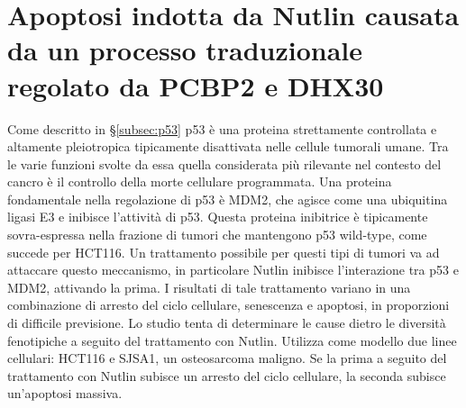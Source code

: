\section{Apoptosi indotta da Nutlin causata da un processo traduzionale regolato da PCBP2 e DHX30}
Come descritto in \S\ref{subsec:p53} p53 \`e una proteina strettamente controllata e altamente pleiotropica tipicamente disattivata nelle cellule tumorali umane.
Tra le varie funzioni svolte da essa quella considerata pi\`u rilevante nel contesto del cancro \`e il controllo della morte cellulare programmata.
Una proteina fondamentale nella regolazione di p53 \`e MDM2, che  agisce come una ubiquitina ligasi E3 e inibisce l'attivit\`a di p53.
Questa proteina inibitrice \`e tipicamente sovra-espressa nella frazione di tumori che mantengono p53 wild-type, come succede per HCT116.
Un trattamento possibile per questi tipi di tumori va ad attaccare questo meccanismo, in particolare Nutlin inibisce l'interazione tra p53 e MDM2, attivando la prima.
I risultati di tale trattamento variano in una combinazione di arresto del ciclo cellulare, senescenza e apoptosi, in proporzioni di difficile previsione.
Lo studio \cite{nutlin} tenta di determinare le cause dietro le diversit\`a fenotipiche a seguito del trattamento con Nutlin.
Utilizza come modello due linee cellulari: HCT116 e SJSA1, un osteosarcoma maligno.
Se la prima a seguito del trattamento con Nutlin subisce un arresto del ciclo cellulare, la seconda subisce un'apoptosi massiva.

